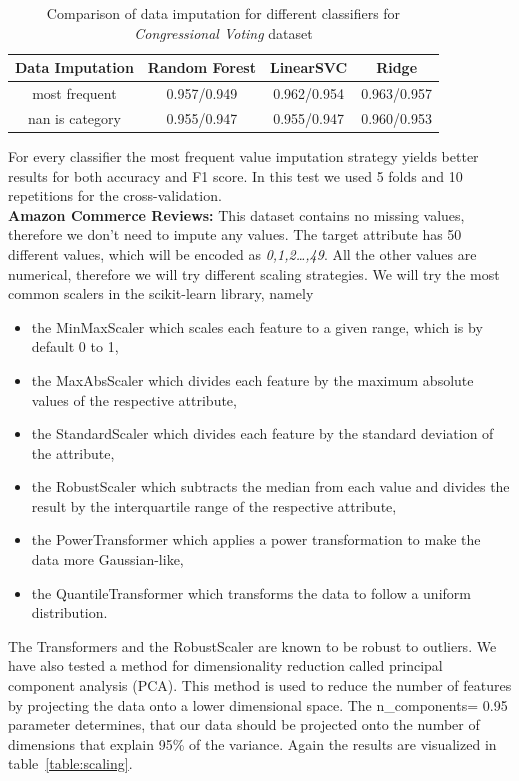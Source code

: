 \documentclass[a4paper,12pt]{article}
\begin{document}
\begin{table}[h!]
\centering
\begin{tabular}{|c|c|c|c|}
\hline
\textbf{Data Imputation} & \textbf{Random Forest} & \textbf{LinearSVC} & \textbf{Ridge} \\
\hline
\textsf{most frequent} & \cellcolor[HTML]{C1E1C1}0.957/0.949 & \cellcolor[HTML]{C1E1C1}0.962/0.954 & \cellcolor[HTML]{C1E1C1}0.963/0.957 \\
\hline
\textsf{nan is category} & 0.955/0.947 & 0.955/0.947 & 0.960/0.953 \\
\hline
\end{tabular}
\caption{Comparison of data imputation for different classifiers for \textit{Congressional Voting} dataset}
\label{table:imputation}
\end{table}
For every classifier the most frequent value imputation strategy yields better results for both accuracy and F1 score.
In this test we used 5 folds and 10 repetitions for the cross-validation.\\
\textbf{Amazon Commerce Reviews:} This dataset contains no missing values, therefore we don't need to impute any values.
The target attribute has 50 different values, which will be encoded as \textit{0,1,2\ldots,49}. 
All the other values are numerical, therefore we will try different scaling strategies.
We will try the most common scalers in the scikit-learn library, namely 
\begin{itemize}
    \item the MinMaxScaler which scales each feature to a given range, which is by default 0 to 1,
    \item the MaxAbsScaler which divides each feature by the maximum absolute values of the respective attribute,
    \item the StandardScaler which divides each feature by the standard deviation of the attribute,
    \item the RobustScaler which subtracts the median from each value and divides the result by the interquartile range of the respective attribute,
    \item the PowerTransformer which applies a power transformation to make the data more Gaussian-like,
    \item the QuantileTransformer which transforms the data to follow a uniform distribution.
\end{itemize}
The Transformers and the RobustScaler are known to be robust to outliers. We have also tested a method for dimensionality reduction called
principal component analysis (PCA). This method is used to reduce the number of features by projecting the data onto a lower dimensional space. 
The n\_components= 0.95 parameter determines, that our data should be projected onto the number of dimensions that explain 95\% of the variance.
Again the results are visualized in table~\ref{table:scaling}.
\end{document}

